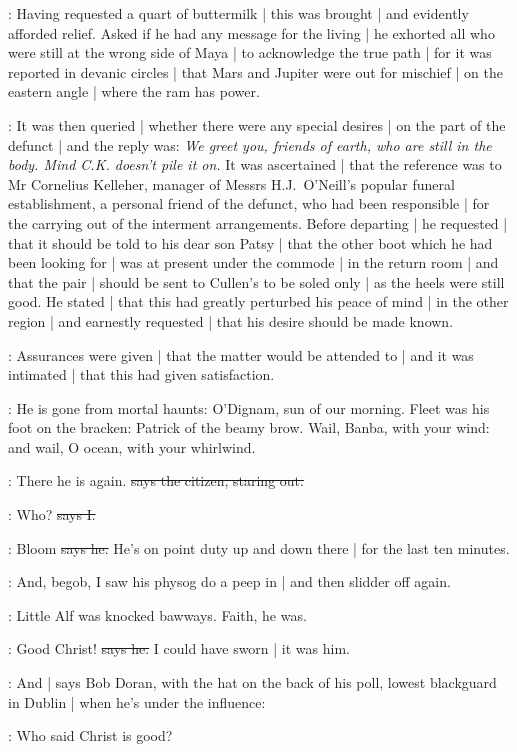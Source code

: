 :
Having requested a quart of buttermilk |
this was brought |
and evidently afforded relief.
Asked if he had any message for the living |
he exhorted all who were still at the wrong side of Maya |
to acknowledge the true path |
for it was reported in devanic circles |
that Mars and Jupiter were out for mischief |
on the eastern angle |
where the ram has power.%

:
It was then queried |
whether there were any special desires |
on the part of the defunct |
and the reply was:
\emph{We greet you,
friends of earth,
who are still in the body.
Mind C.K. doesn't pile it on.}
It was ascertained |
that the reference was to Mr Cornelius Kelleher,
manager of Messrs H.J.~O'Neill's popular funeral establishment,
a personal friend of the defunct,
who had been responsible |
for the carrying out of the interment arrangements.
Before departing |
he requested |
that it should be told to his dear son Patsy |
that the other boot which he had been looking for |
was at present under the commode |
in the return room |
and that the pair |
should be sent to Cullen's to be soled only |
as the heels were still good.%
He stated |
that this had greatly perturbed his peace of mind |
in the other region |
and earnestly requested |
that his desire should be made known.

:
Assurances were given |
that the matter would be attended to |
and it was intimated |
that this had given satisfaction.

:
He is gone from mortal haunts:
O'Dignam,
sun of our morning.
Fleet was his foot on the bracken:
Patrick of the beamy brow.
Wail,
Banba,
with your wind:
and wail,
O ocean,
with your whirlwind.

\citizen:
There he is again.
\sout{says the citizen,
staring out.}

:
Who?
\sout{says I.}

\citizen:
Bloom
\sout{says he.}
He's on point duty up and down there |
for the last ten minutes.%

\Nq:
And,
begob,
I saw his physog do a peep in |
and then slidder off again.

\Nq:
Little Alf was knocked bawways.
Faith,
he was.

\bergan:
Good Christ!
\sout{says he.}
I could have sworn |
it was him.

\Nq:
And |
says Bob Doran,
with the hat on the back of his poll,
lowest blackguard in Dublin |
when he's under the influence:

\doran:
Who said Christ is good?

